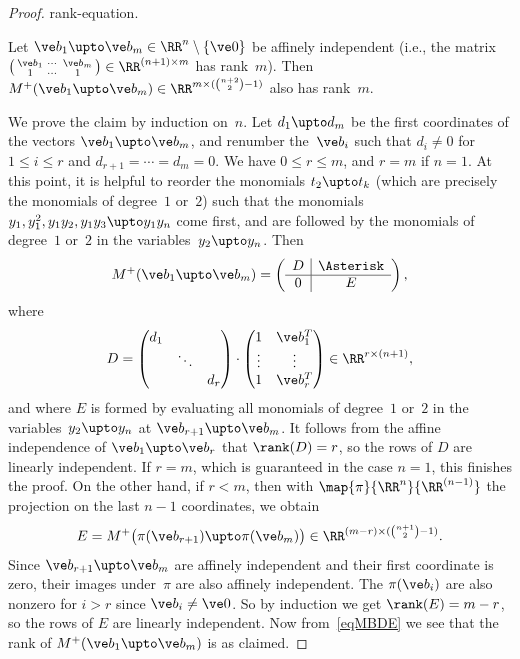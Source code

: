 \documentclass[reqno]{amsart}
\begin{document}
\begin{proof}
  rank-equation.
  \begin{claim*}
    Let $\ve b_1 \upto \ve b_m \in \RR^n \setminus \{\ve 0\}$ be
    affinely independent (i.e., the matrix
    $\left(\begin{smallmatrix} \ve b_1 & \cdots & \ve b_m \\ 1 &
        \cdots & 1\end{smallmatrix}\right) \in \RR^{(n+1) \times m}$
    has rank~$m$). Then
    $M^+(\ve b_1 \upto \ve b_m) \in \RR^{m \times (\binom{n+2}{2}-1)}$
    also has rank~$m$.
  \end{claim*}
  We prove the claim by induction on~$n$. Let $d_1 \upto d_m$ be the
  first coordinates of the vectors $\ve b_1 \upto \ve b_m$, and
  renumber the~$\ve b_i$ such that $d_i \ne 0$ for $1 \le i \le r$ and
  $d_{r+1} = \cdots = d_m = 0$. We have $0 \le r \le m$, and $r = m$
  if $n = 1$. At this point, it is helpful to reorder the monomials
  $t_2 \upto t_k$ (which are precisely the monomials of degree~$1$
  or~$2$) such that the monomials
  $y_1,y_1 ^2, y_1 y_2,y_1 y_3 \upto y_1 y_n$ come first, and are
  followed by the monomials of degree~$1$ or~$2$ in the
  variables~$y_2 \upto y_n$. Then
  \begin{equation} \label{eqMBDE}%
    M^+(\ve b_1 \upto \ve b_m) = \left(
      \begin{array}{c|c}
        D & \Asterisk \\
        \hline
        0 & E
      \end{array}\right),
  \end{equation}
  where
  \[
    D = %
    \begin{pmatrix}
      d_1 \\
      & \ddots \\
      & & d_r
    \end{pmatrix} \cdot
    \begin{pmatrix}
      1 & \ve b_1 ^T \\
      \vdots & \vdots \\
      1 & \ve b_r^T
    \end{pmatrix} \in \RR^{r \times (n+1)},
  \]
  and where $E$ is formed by evaluating all monomials of degree~$1$
  or~$2$ in the variables~$y_2 \upto y_n$ at
  $\ve b_{r+1} \upto \ve b_m$. It follows from the affine independence
  of $\ve b_1 \upto \ve b_r$ that $\rank(D) = r$, so the rows of $D$
  are linearly independent. If $r = m$, which is guaranteed in the
  case $n = 1$, this finishes the proof. On the other hand, if
  $r < m$, then with $\map{\pi}{\RR^n}{\RR^{(n-1)}}$ the projection on
  the last $n-1$ coordinates, we obtain
  \[
    E = M^+\bigl(\pi(\ve b_{r+1}) \upto \pi(\ve b_m)\bigr) \in
    \RR^{(m-r) \times (\binom{n+1}{2}-1)}.
  \]
  Since $\ve b_{r+1} \upto \ve b_m$ are affinely independent and their
  first coordinate is zero, their images under~$\pi$ are also affinely
  independent. The $\pi(\ve b_i)$ are also nonzero for $i > r$ since
  $\ve b_i \ne \ve 0$. So by induction we get $\rank(E) = m - r$, so
  the rows of $E$ are linearly independent. Now from~\eqref{eqMBDE} we
  see that the rank of $M^+(\ve b_1 \upto \ve b_m)$ is as claimed.
\end{proof}
\end{document}
